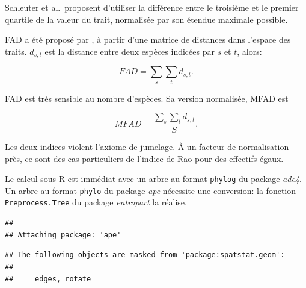\documentclass[
  11pt,
  french,
  a4paper,
  extrafontsizes,onecolumn,openright
  ]{memoir}
\newenvironment{Shaded}{\begin{snugshade}}{\end{snugshade}}
\newcommand{\CommentTok}[1]{\textcolor[rgb]{0.56,0.35,0.01}{\textit{#1}}}
\newcommand{\DecValTok}[1]{\textcolor[rgb]{0.00,0.00,0.81}{#1}}
\newcommand{\KeywordTok}[1]{\textcolor[rgb]{0.13,0.29,0.53}{\textbf{#1}}}
\newcommand{\NormalTok}[1]{#1}
\newcommand{\OperatorTok}[1]{\textcolor[rgb]{0.81,0.36,0.00}{\textbf{#1}}}
\newcommand{\StringTok}[1]{\textcolor[rgb]{0.31,0.60,0.02}{#1}}
\begin{document}
Schleuter et al.~proposent d'utiliser la différence entre le troisième et le premier quartile de la valeur du trait, normalisée par son étendue maximale possible.

FAD a été proposé par \textcite{Walker1999}, à partir d'une matrice de distances dans l'espace des traits.
\(d_{s,t}\) est la distance entre deux espèces indicées par \(s\) et \(t\), alors:

\begin{equation}
  \label{eq:FAD}
  \mathit{FAD}=\sum_s{\sum_t{d_{s,t}}}.
\end{equation}

FAD est très sensible au nombre d'espèces.
Sa version normalisée, MFAD \autocite{Schmera2009} est

\begin{equation}
  \label{eq:MFAD}
  \mathit{MFAD}=\frac{\sum_s{\sum_t{d_{s,t}}}}{S}.
\end{equation}

Les deux indices violent l'axiome de jumelage.
À un facteur de normalisation près, ce sont des cas particuliers de l'indice de Rao pour des effectifs égaux.

Le calcul sous R est immédiat avec un arbre au format \texttt{phylog} du package \emph{ade4}.
Un arbre au format \texttt{phylo} du package \emph{ape} nécessite une conversion: la fonction \texttt{Preprocess.Tree} du package \emph{entropart} la réalise.

\scriptsize

\begin{Shaded}
\end{Shaded}

\begin{verbatim}
## 
## Attaching package: 'ape'
\end{verbatim}

\begin{verbatim}
## The following objects are masked from 'package:spatstat.geom':
## 
##     edges, rotate
\end{verbatim}
\end{document}
